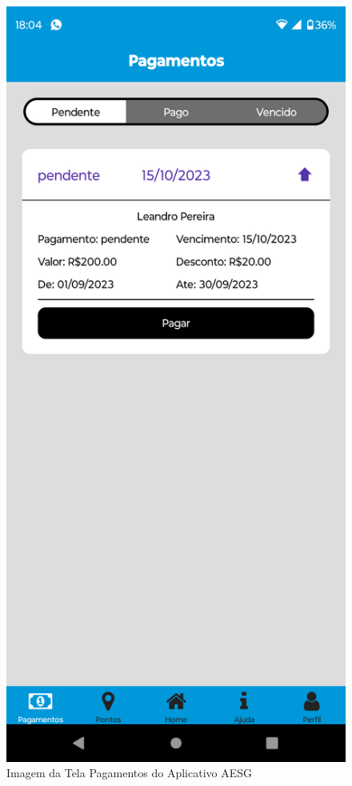 \documentclass[
    12pt,                   %
    openright,              %
    oneside,                %
    a4paper,                %
    sumario=tradicional,    %
    english,                %
    brazil,                 %
    ]{abntex2}
\begin{document}
            \begin{figure}[!h]          
                \begin{minipage}{0.5\textwidth}
                    \centering
                    \includegraphics[width=0.8\linewidth]{Imagens/App Images User/AUPagamento1.png}
                    \caption[Imagem da Tela Pagamentos do Aplicativo AESG]{ 
                    Imagem da Tela Pagamentos do Aplicativo AESG}
                    \label{fig:AppTelaPagamentos}

\end{minipage}
\end{figure}
\end{document}
